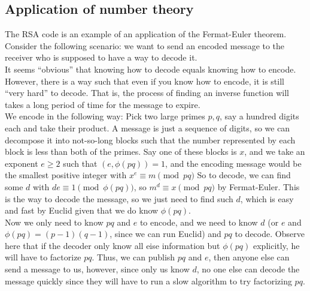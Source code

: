 \subsection{Application of number theory}
The RSA code is an example of an application of the Fermat-Euler theorem.
Consider the following scenario: we want to send an encoded message to the receiver who is supposed to have a way to decode it.\\
It seems ``obvious'' that knowing how to decode equals knowing how to encode.
However, there is a way such that even if you know how to encode, it is still ``very hard'' to decode.
That is, the process of finding an inverse function will takes a long period of time for the message to expire.\\
We encode in the following way:
Pick two large primes $p,q$, say a hundred digits each and take their product.
A message is just a sequence of digits, so we can decompose it into not-so-long blocks such that the number represented by each block is less than both of the primes.
Say one of these blocks is $x$, and we take an exponent $e\ge 2$ such that $(e,\phi(pq))=1$, and the encoding message would be the smallest positive integer with $x^e\equiv m\pmod{pq}$
So to decode, we can find some $d$ with $de\equiv 1\pmod{\phi(pq)}$, so $m^d\equiv x\pmod{pq}$ by Fermat-Euler.
This is the way to decode the message, so we just need to find such $d$, which is easy and fast by Euclid given that we do know $\phi(pq)$.\\
Now we only need to know $pq$ and $e$ to encode, and we need to know $d$ (or $e$ and $\phi(pq)=(p-1)(q-1)$, since we can run Euclid) and $pq$ to decode.
Observe here that if the decoder only know all eise information but $\phi(pq)$ explicitly, he will have to factorize $pq$.
Thus, we can publish $pq$ and $e$, then anyone else can send a message to us, however, since only us know $d$, no one else can decode the message quickly since they will have to run a slow algorithm to try factorizing $pq$.